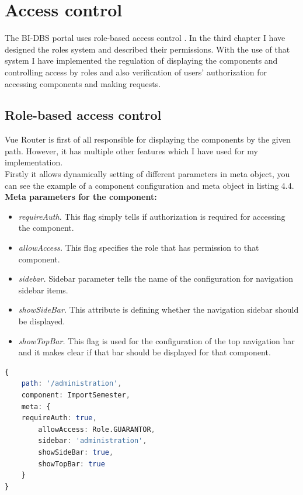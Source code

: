 \section{Access control} The BI-DBS portal uses role-based access control \cite{role-auth}. In the third chapter I have designed the roles system and described their permissions. With the use of that system I have implemented the regulation of displaying the components and controlling access by roles and also verification of users' authorization for accessing components and making requests.

\subsection{Role-based access control} Vue Router is first of all responsible for displaying the components by the given path. However, it has multiple other features which I have used for my implementation.\\
Firstly it allows dynamically setting of different parameters in meta object, you can see the example of a component configuration and meta object in listing 4.4.\\

\noindent \textbf{Meta parameters for the component:}

\begin{itemize}
    \item \emph{requireAuth.} This flag simply tells if authorization is required for accessing the component.
    \item \emph{allowAccess.} This flag specifies the role that has permission to that component.
    \item \emph{sidebar.} Sidebar parameter tells the name of the configuration for navigation sidebar items.
    \item \emph{showSideBar.} This attribute is defining whether the navigation sidebar should be displayed.
    \item \emph{showTopBar.} This flag is used for the configuration of the top navigation bar and it makes clear if that bar should be displayed for that component.
\end{itemize}

\begin{lstlisting}[language=Octave, caption=The example of component configuration in Router]
{
    path: '/administration',
    component: ImportSemester,
    meta: {
    requireAuth: true,
        allowAccess: Role.GUARANTOR,
        sidebar: 'administration',
        showSideBar: true,
        showTopBar: true
    }
}
\end{lstlisting}

